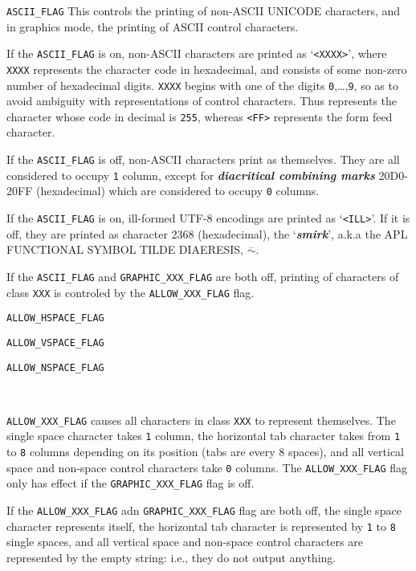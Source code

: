 \documentclass[12pt]{article}
\makeatletter
\newcommand{\key}[1]{{\bf \em #1}\index{#1}}
\newcommand{\skey}[2]{{\bf \em #1#2}\index{#1}}
\newcommand{\ttnbmkey}[2]{{\tt #1}\index{#1@{\tt #1}!#2}}
\newcommand{\EOL}{\penalty \exhyphenpenalty}
\newenvironment{indpar}[1][0.3in]%
	{\begin{list}{}%
		     {\setlength{\itemsep}{0in}%
		      \setlength{\topsep}{0in}%
		      \setlength{\parsep}{1ex}%
		      \setlength{\labelwidth}{#1}%
		      \setlength{\leftmargin}{#1}%
		      \addtolength{\leftmargin}{\labelsep}}%
	 \item}%
	{\end{list}}
\newenvironment{itemlist}[1][1.2in]%
	{\begin{list}{}{\setlength{\labelwidth}{#1}%
		        \setlength{\leftmargin}{\labelwidth}%
		        \addtolength{\leftmargin}{+0.2in}%
		        \renewcommand{\makelabel}[1]{##1\hfill}}}%
	{\end{list}}
\makeatother
\begin{document}
\begin{indpar}
\begin{itemlist}[1.4in]
\item[\ttnbmkey{ASCII\_FLAG}{{\tt min::printer\_parameters} flag}]
This controls the printing of non-ASCII UNICODE characters, and in
graphics mode, the printing of ASCII control characters.

If the {\tt ASCII\_FLAG} is on,
non-ASCII characters are printed as `{\tt <XXXX>}', where
{\tt XXXX} represents the character code in hexadecimal,
and consists of some non-zero number of hexadecimal digits.
{\tt XXXX} begins with
one of the digits {\tt 0},\dots,{\tt 9}, so as to avoid
ambiguity with representations of control characters.  Thus
{\tt <0FF>} represents the character whose code in decimal is
{\tt 255}, whereas {\tt <FF>} represents the form feed character.

If the {\tt ASCII\_FLAG} is off, non-ASCII characters print as
themselves.  They are all considered to occupy {\tt 1} column, except
for \skey{diacritical combining mark}s
20D0-20FF (hexadecimal) which are considered
to occupy {\tt 0} columns.

If the {\tt ASCII\_FLAG} is on,
ill-formed UTF-8 encodings are printed as `{\tt <ILL>}'.  If it is
off, they are printed as character 2368 (hexadecimal), the `\key{smirk}', a.k.a
the APL FUNCTIONAL SYMBOL TILDE DIAERESIS, $\stackrel{..}{\sim}$.

If the {\tt ASCII\_FLAG} and {\tt GRAPHIC\_\EOL XXX\_\EOL FLAG} are both off,
printing of characters of class {\tt XXX} is controled by the
{\tt ALLOW\_\EOL XXX\_\EOL FLAG} flag.

\item[\ttnbmkey{ALLOW\_HSPACE\_FLAG}{{\tt min::printer\_parameters} flag}]
\item[\ttnbmkey{ALLOW\_VSPACE\_FLAG}{{\tt min::printer\_parameters} flag}]
\item[\ttnbmkey{ALLOW\_NSPACE\_FLAG}{{\tt min::printer\_parameters} flag}]
{\raggedright~\\}
{\tt ALLOW\_XXX\_FLAG} causes all characters in class {\tt XXX} to
represent themselves.  The single space character takes {\tt 1}
column, the horizontal tab character takes from {\tt 1} to {\tt 8}
columns depending on its position (tabs are every 8 spaces), and
all vertical space and non-space control characters take {\tt 0}
columns.  The {\tt ALLOW\_XXX\_FLAG} flag only has effect if the
{\tt GRAPHIC\_XXX\_FLAG} flag is off.

If the {\tt ALLOW\_XXX\_FLAG} adn
{\tt GRAPHIC\_XXX\_FLAG} flag are both off, the single space
character represents itself, the horizontal tab character is
represented by {\tt 1} to {\tt 8} single spaces, and all
vertical space and non-space control characters are represented
by the empty string: i.e., they do not output anything.


\end{itemlist}
\end{indpar}
\end{document}
